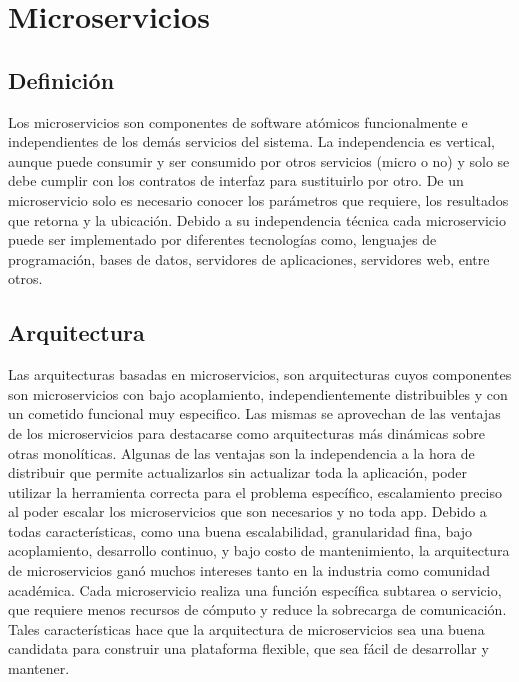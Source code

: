 \section{Microservicios}

\subsection{Definición}

    Los microservicios son componentes de software atómicos funcionalmente e independientes de los demás servicios del sistema. La independencia es vertical, aunque puede consumir y ser consumido por otros servicios (micro o no) y solo se debe cumplir con los contratos de interfaz para sustituirlo por otro. De un microservicio solo es necesario conocer los parámetros que requiere, los resultados que retorna y la ubicación.
    Debido a su independencia técnica cada microservicio puede ser implementado por diferentes tecnologías como, lenguajes de programación, bases de datos, servidores de aplicaciones, servidores web, entre otros.\par


\subsection{Arquitectura}

    Las arquitecturas basadas en microservicios, son arquitecturas cuyos componentes son microservicios con bajo acoplamiento, independientemente distribuibles y con un cometido funcional muy especifico.
    Las mismas se aprovechan de las ventajas de los microservicios para destacarse como arquitecturas más dinámicas sobre otras monolíticas.
    Algunas de las ventajas son la independencia a la hora de distribuir que permite actualizarlos sin actualizar toda la aplicación, poder utilizar la herramienta correcta para el problema específico, escalamiento preciso al poder escalar los microservicios que son necesarios y no toda app.
    Debido a todas características, como una buena escalabilidad, granularidad fina, bajo acoplamiento, desarrollo continuo, y bajo costo de mantenimiento, la arquitectura de microservicios ganó muchos intereses tanto en la industria como
    comunidad académica. Cada microservicio realiza una función específica subtarea o servicio, que requiere menos recursos de cómputo
    y reduce la sobrecarga de comunicación. Tales características hace que la arquitectura de microservicios sea una buena candidata para construir una plataforma flexible, que sea fácil de desarrollar y mantener.\par


